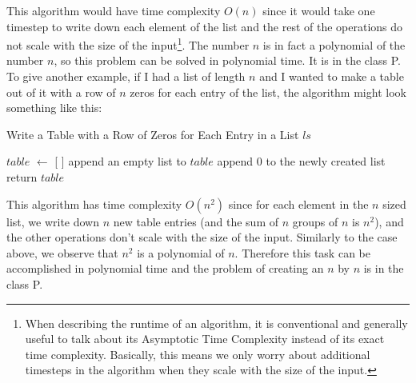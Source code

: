 \documentclass[12pt,twoside]{reedthesis}
\begin{document}
    This algorithm would have time complexity $O(n)$ since it would take one timestep to write down each element of the list and the rest of the operations do not scale with the size of the input\footnote{When describing the runtime of an algorithm, it is conventional and generally useful to talk about its Asymptotic Time Complexity instead of its exact time complexity. Basically, this means we only worry about additional timesteps in the algorithm when they scale with the size of the input.}. The number $n$ is in fact a polynomial of the number $n$, so this problem can be solved in polynomial time. It is in the class P. To give another example, if I had a list of length $n$ and I wanted to make a table out of it with a row of $n$ zeros for each entry of the list, the algorithm might look something like this:
\begin{algorithm}
\caption{Write a Table with a Row of Zeros for Each Entry in a List $ls$}
\begin{algorithmic}
\State $table$ $\gets$ [ ]
\State append an empty list to $table$
\State append 0 to the newly created list
\EndFor
\EndFor
\State return $table$
\end{algorithmic}
\end{algorithm}
	This algorithm has time complexity $O(n^2)$ since for each element in the $n$ sized list, we write down $n$ new table entries (and the sum of $n$ groups of $n$ is $n^2$), and the other operations don't scale with the size of the input. Similarly to the case above, we observe that $n^2$ is a polynomial of $n$. Therefore this task can be accomplished in polynomial time and the problem of creating an $n$ by $n$ is in the class P.\par
{}
\end{document}
